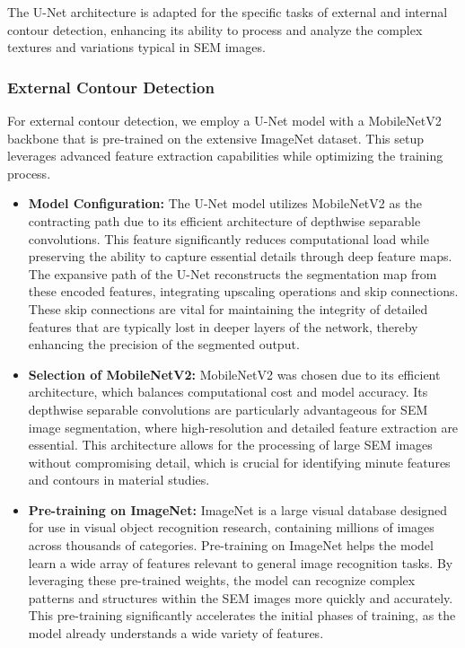 \documentclass[preprint,12pt]{elsarticle}
\begin{document}
The U-Net architecture is adapted for the specific tasks of external and internal contour detection, enhancing its ability to process and analyze the complex textures and variations typical in SEM images.

\subsubsection{External Contour Detection}
For external contour detection, we employ a U-Net model with a MobileNetV2 backbone that is pre-trained on the extensive ImageNet dataset. This setup leverages advanced feature extraction capabilities while optimizing the training process.

\begin{itemize}
    \item \textbf{Model Configuration:} The U-Net model utilizes MobileNetV2 as the contracting path due to its efficient architecture of depthwise separable convolutions. This feature significantly reduces computational load while preserving the ability to capture essential details through deep feature maps. The expansive path of the U-Net reconstructs the segmentation map from these encoded features, integrating upscaling operations and skip connections. These skip connections are vital for maintaining the integrity of detailed features that are typically lost in deeper layers of the network, thereby enhancing the precision of the segmented output.

    \item \textbf{Selection of MobileNetV2:} MobileNetV2 was chosen due to its efficient architecture, which balances computational cost and model accuracy. Its depthwise separable convolutions are particularly advantageous for SEM image segmentation, where high-resolution and detailed feature extraction are essential. This architecture allows for the processing of large SEM images without compromising detail, which is crucial for identifying minute features and contours in material studies.

    \item \textbf{Pre-training on ImageNet:} ImageNet is a large visual database designed for use in visual object recognition research, containing millions of images across thousands of categories. Pre-training on ImageNet helps the model learn a wide array of features relevant to general image recognition tasks. By leveraging these pre-trained weights, the model can recognize complex patterns and structures within the SEM images more quickly and accurately. This pre-training significantly accelerates the initial phases of training, as the model already understands a wide variety of features.


\end{itemize}
\end{document}
